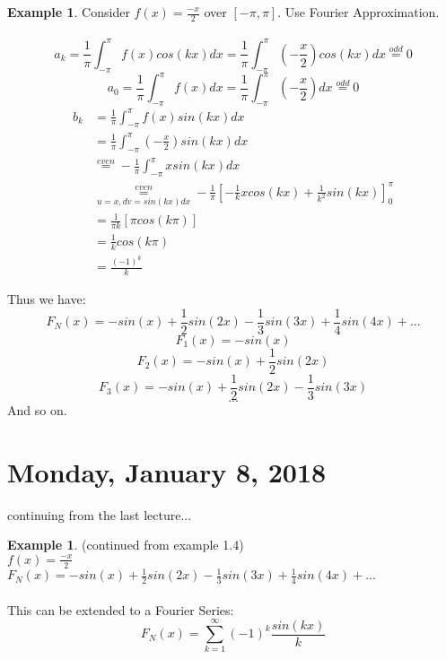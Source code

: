\documentclass[12pt]{article}
\theoremstyle{plain}
\theoremstyle{definition}
\newtheorem{example}[theorem]{Example}
\begin{document}
\begin{example}
	Consider $f(x)=\frac{-x}{2}$ over $[-\pi, \pi]$. Use Fourier Approximation.\\
	\\
	$$a_k = \frac{1}{\pi} \int^{\pi}_{-\pi} f(x) cos(kx) dx = \frac{1}{\pi} \int^{\pi}_{-\pi} (-\frac{x}{2}) cos(kx) dx \overset{odd}{=} 0$$
	$$a_0 = \frac{1}{\pi} \int^{\pi}_{-\pi} f(x) dx = \frac{1}{\pi} \int^{\pi}_{-\pi} (-\frac{x}{2}) dx \overset{odd}{=} 0$$
	\begin{align*}
		b_k &= \frac{1}{\pi} \int^{\pi}_{-\pi} f(x) sin(kx) dx\\
		&= \frac{1}{\pi} \int^{\pi}_{-\pi} (-\frac{x}{2}) sin(kx) dx\\
		&\overset{even}{=} - \frac{1}{\pi} \int^{\pi}_{-\pi}  x sin(kx) dx\\
		&\underset{u=x, dv=sin(kx)dx}{\overset{even}{=}} - \frac{1}{\pi} [-\frac{1}{k} x cos(kx) + \frac{1}{k^2} sin(kx)]^\pi_0\\
		&= \frac{1}{\pi k} [\pi cos(k\pi)]\\
		&= \frac{1}{k} cos(k\pi)\\
		&= \frac{(-1)^k}{k}
	\end{align*}
	
	Thus we have:
	$$F_N (x) = -sin(x) + \frac{1}{2}sin(2x) - \frac{1}{3}sin(3x) + \frac{1}{4}sin(4x) + ...$$
	$$F_1 (x) = -sin(x)$$
	$$F_2 (x) = -sin(x) + \frac{1}{2}sin(2x)$$
	$$F_3 (x) = -sin(x) + \frac{1}{2}sin(2x) - \frac{1}{3}sin(3x)$$
	$$...$$
	And so on.

\end{example}

\newpage

\section{Monday, January 8, 2018}

continuing from the last lecture...

\begin{example}
    (continued from example 1.4)\\
    $f(x) = \frac{-x}{2}$\\
    $F_N (x) = -sin(x) + \frac{1}{2}sin(2x) - \frac{1}{3}sin(3x) + \frac{1}{4}sin(4x) + ...$\\
    \\
    This can be extended to a Fourier Series:
    $$F_N (x) = \sum^\infty_{k=1} (-1)^k \frac{sin(kx)}{k}$$
\end{example}
\end{document}
